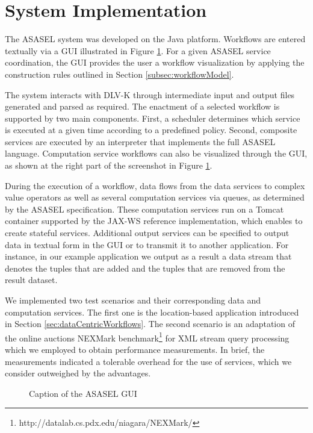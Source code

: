 
\section{System Implementation} \label{sec:systemImplementation}
	
The ASASEL system was developed on the Java platform. Workflows are entered textually via a GUI illustrated in Figure \ref{fig:asaselGUI}. For a given ASASEL service coordination, the GUI provides the user a workflow visualization by applying the construction rules outlined in Section \ref{subsec:workflowModel}.

The system interacts with DLV-K through intermediate input and output files generated and parsed as required. The enactment of a selected workflow is supported by two main components. First, a scheduler determines which service is executed at a given time according to a predefined policy. Second, composite services are executed by an interpreter that implements the full ASASEL language. Computation service workflows can also be visualized through the GUI, as shown at the right part of the screenshot in Figure \ref{fig:asaselGUI}.
	
During the execution of a workflow, data flows from the data services to complex value operators as well as several computation services via queues, as determined by the ASASEL specification. These computation services run on a Tomcat container supported by the JAX-WS reference implementation, which enables to create stateful services. Additional output services can be specified to output data in textual form in the GUI or to transmit it to another application. For instance, in our example application we output as a result a data stream that denotes the tuples that are added and the tuples that are removed from the result dataset.
	
We implemented two test scenarios and their corresponding data and computation services. The first one is the location-based application introduced in Section \ref{sec:dataCentricWorkflows}. The second scenario is an adaptation of the online auctions NEXMark benchmark\footnote{http://datalab.cs.pdx.edu/niagara/NEXMark/} for XML stream query processing which we employed to obtain performance measurements. In brief, the measurements indicated a tolerable overhead for the use of services, which we consider outweighed by the advantages.
	
\begin{figure}
   \begin{center}
   \end{center}
   \caption{Caption of the ASASEL GUI}
   \label{fig:asaselGUI}
\end{figure}

